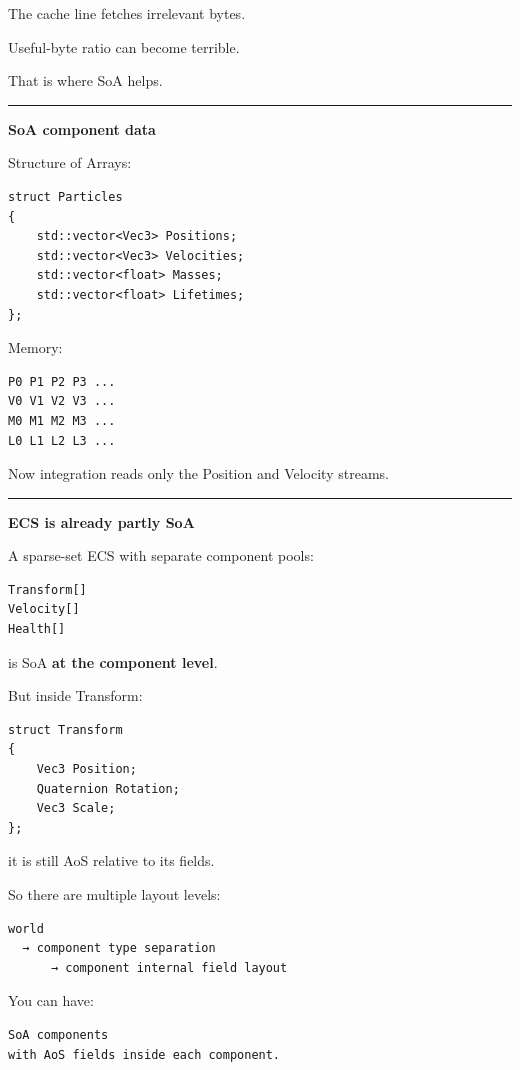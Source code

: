 The cache line fetches irrelevant bytes.

Useful-byte ratio can become terrible.

That is where SoA helps.

\begin{center}\rule{0.5\linewidth}{0.5pt}\end{center}

\textbf{SoA component data}

Structure of Arrays:

\begin{verbatim}
struct Particles
{
    std::vector<Vec3> Positions;
    std::vector<Vec3> Velocities;
    std::vector<float> Masses;
    std::vector<float> Lifetimes;
};
\end{verbatim}

Memory:

\begin{verbatim}
P0 P1 P2 P3 ...
V0 V1 V2 V3 ...
M0 M1 M2 M3 ...
L0 L1 L2 L3 ...
\end{verbatim}

Now integration reads only the Position and Velocity streams.

\begin{center}\rule{0.5\linewidth}{0.5pt}\end{center}

\textbf{ECS is already partly SoA}

A sparse-set ECS with separate component pools:

\begin{verbatim}
Transform[]
Velocity[]
Health[]
\end{verbatim}

is SoA \textbf{at the component level}.

But inside Transform:

\begin{verbatim}
struct Transform
{
    Vec3 Position;
    Quaternion Rotation;
    Vec3 Scale;
};
\end{verbatim}

it is still AoS relative to its fields.

So there are multiple layout levels:

\begin{verbatim}
world
  → component type separation
      → component internal field layout
\end{verbatim}

You can have:

\begin{verbatim}
SoA components
with AoS fields inside each component.
\end{verbatim}

